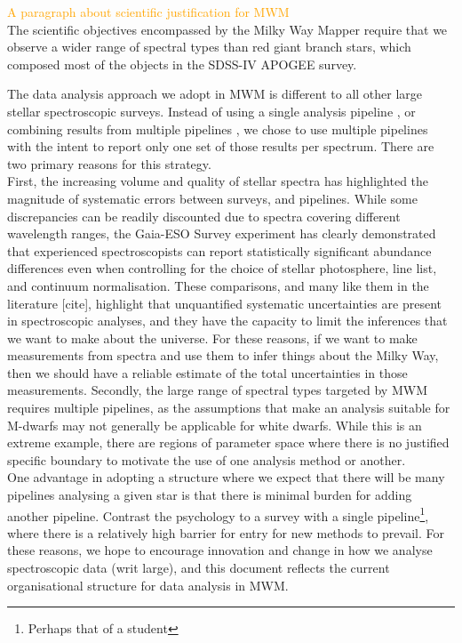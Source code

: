\documentclass[modern]{aastex631}
\newcommand{\todo}[1]{\textcolor{orange}{#1}}
\begin{document}
\todo{A paragraph about scientific justification for MWM}\\

The scientific objectives encompassed by the Milky Way Mapper require that we observe a wider range of spectral types than red giant branch stars, which composed most of the objects in the SDSS-IV APOGEE survey.

The data analysis approach we adopt in MWM is different to all other large stellar spectroscopic surveys.
Instead of using a single analysis pipeline \citep{galah}, or combining results from multiple pipelines \citep{ges}, we chose to use multiple pipelines with the intent to report only one set of those results per spectrum.
There are two primary reasons for this strategy.\\

First, the increasing volume and quality of stellar spectra has highlighted the magnitude of systematic errors between surveys, and pipelines. While some discrepancies can be readily discounted due to spectra covering different wavelength ranges, the Gaia-ESO Survey experiment has clearly demonstrated that experienced spectroscopists can report statistically significant abundance differences even when controlling for the choice of stellar photosphere, line list, and continuum normalisation.
These comparisons, and many like them in the literature [cite], highlight that unquantified systematic uncertainties are present in spectroscopic analyses, and they have the capacity to limit the inferences that we want to make about the universe.
For these reasons, if we want to make measurements from spectra and use them to infer things about the Milky Way, then we should have a reliable estimate of the total uncertainties in those measurements.
Secondly, the large range of spectral types targeted by MWM requires multiple pipelines, as the assumptions that make an analysis suitable for M-dwarfs may not generally be applicable for white dwarfs.
While this is an extreme example, there are regions of parameter space where there is no justified specific boundary to motivate the use of one analysis method or another.\\

One advantage in adopting a structure where we expect that there will be many pipelines analysing a given star is that there is minimal burden for adding another pipeline. Contrast the psychology to a survey with a single pipeline\footnote{Perhaps that of a student}, where there is a relatively high barrier for entry for new methods to prevail. For these reasons, we hope to encourage innovation and change in how we analyse spectroscopic data (writ large), and this document reflects the current organisational structure for data analysis in MWM.\\
\end{document}
